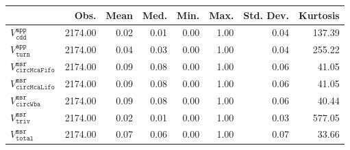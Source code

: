 \begin{tabular}{lrrrrrrr}
  \hline
 & Obs. & Mean & Med. & Min. & Max. & Std. Dev. & Kurtosis \\ 
  \hline
$V^{\mathtt{app}}_{\mathtt{cdd}}$ & 2174.00 & 0.02 & 0.01 & 0.00 & 1.00 & 0.04 & 137.39 \\ 
  $V^{\mathtt{app}}_{\mathtt{turn}}$ & 2174.00 & 0.04 & 0.03 & 0.00 & 1.00 & 0.04 & 255.22 \\ 
  $V^{\mathtt{msr}}_{\mathtt{circMcaFifo}}$ & 2174.00 & 0.09 & 0.08 & 0.00 & 1.00 & 0.06 & 41.05 \\ 
  $V^{\mathtt{msr}}_{\mathtt{circMcaLifo}}$ & 2174.00 & 0.09 & 0.08 & 0.00 & 1.00 & 0.06 & 41.05 \\ 
  $V^{\mathtt{msr}}_{\mathtt{circWba}}$ & 2174.00 & 0.09 & 0.08 & 0.00 & 1.00 & 0.06 & 40.44 \\ 
  $V^{\mathtt{msr}}_{\mathtt{triv}}$ & 2174.00 & 0.02 & 0.01 & 0.00 & 1.00 & 0.03 & 577.05 \\ 
  $V^{\mathtt{msr}}_{\mathtt{total}}$ & 2174.00 & 0.07 & 0.06 & 0.00 & 1.00 & 0.07 & 33.66 \\ 
   \hline
\end{tabular}
